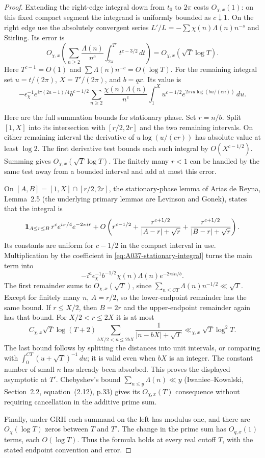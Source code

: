 \begin{proof}
Extending the right-edge integral down from $t_0$ to $2\pi$ costs
$O_{\chi,x}(1)$: on this fixed compact segment the integrand is
uniformly bounded as $c\downarrow1$. On the right edge use the absolutely convergent series
$L'/L=-\sum\chi(n)\Lambda(n)n^{-s}$ and Stirling. Its error is
\[
 O_{\chi,x}\left(\sum_{n\ge2}\frac{\Lambda(n)}{n^c}
                 \int_{2\pi}^{T'}t^{c-3/2}\,dt\right)
 =O_{\chi,x}(\sqrt T\log T).
\]
Here $T^{c-1}=O(1)$ and $\sum\Lambda(n)n^{-c}=O(\log T)$.
For the remaining integral set $u=t/(2\pi)$, $X=T'/(2\pi)$,
and $b=qx$. Its value is
\begin{equation}\label{eq:A037-stationary-integral}
 -\epsilon_\chi^{-1}e^{i\pi(2a-1)/4}
 b^{c-1/2}\sum_{n\ge2}\frac{\chi(n)\Lambda(n)}{n^c}
 \int_1^X u^{c-1/2}
 e^{2\pi i u\log(bu/(en))}\,du.
\end{equation}

Here are the full summation bounds for stationary phase. Set $r=n/b$.
Split $[1,X]$ into its intersection with $[r/2,2r]$ and the two
remaining intervals. On either remaining interval the derivative of
$u\log(u/(er))$ has absolute value at least $\log2$. The first
derivative test bounds each such integral by $O(X^{c-1/2})$.
Summing gives $O_{\chi,x}(\sqrt T\log T)$. The finitely many $r<1$
can be handled by the same test away from a bounded interval and add
at most this error.

On $[A,B]=[1,X]\cap[r/2,2r]$, the stationary-phase lemma of Arias
de Reyna, Lemma~2.5 (the underlying primary lemmas are Levinson and
Gonek), states that the integral is
\[
 {\bf1}_{A\le r\le B}\,r^c e^{i\pi/4}e^{-2\pi i r}
 +O\left(r^{c-1/2}
 +\frac{r^{c+1/2}}{|A-r|+\sqrt r}
 +\frac{r^{c+1/2}}{|B-r|+\sqrt r}\right).
\]
Its constants are uniform for $c-1/2$ in the compact interval in use.
Multiplication by the coefficient in
\eqref{eq:A037-stationary-integral} turns the main term into
\[
 -i^a\epsilon_\chi^{-1}b^{-1/2}
       \chi(n)\Lambda(n)e^{-2\pi i n/b}.
\]
The first remainder sums to $O_{\chi,x}(\sqrt T)$, since
$\sum_{n\le C T}\Lambda(n)n^{-1/2}\ll\sqrt T$.
Except for finitely many $n$, $A=r/2$, so the lower-endpoint
remainder has the same bound. If $r\le X/2$, then $B=2r$ and the
upper-endpoint remainder again has that bound. For $X/2<r\le2X$
it is at most
\[
 C_{\chi,x}\sqrt T\log(T+2)
 \sum_{bX/2<n\le2bX}
       \frac1{|n-bX|+\sqrt T}
 \ll_{\chi,x}\sqrt T\log^2T.
\]
The last bound follows by splitting the distances into unit intervals,
or comparing with $\int_0^{C T}(u+\sqrt T)^{-1}\,du$; it is valid
even when $bX$ is an integer. The constant number of small $n$ has
already been absorbed. This proves the displayed asymptotic at $T'$.
Chebyshev's bound $\sum_{n\le y}\Lambda(n)\ll y$
(Iwaniec--Kowalski, Section~2.2, equation~(2.12), p.33) gives its
$O_{\chi,x}(T)$ consequence without requiring cancellation in the
additive prime sum.

Finally, under GRH each summand on the left has modulus one, and
there are $O_\chi(\log T)$ zeros between $T$ and $T'$. The change
in the prime sum has $O_{q,x}(1)$ terms, each $O(\log T)$.
Thus the formula holds at every real cutoff $T$, with the stated
endpoint convention and error.
\end{proof}

